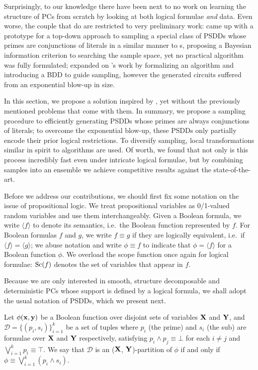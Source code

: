 Surprisingly, to our knowledge there have been next to no work on learning the structure of PCs
from scratch by looking at both logical formulae \emph{and} data. Even worse, the couple that do
are restricted to very preliminary work: \citet{mattei19} came up with a \divclass{} prototype for
a top-down approach to sampling a special class of PSDDs whose primes are conjunctions of literals
in a similar manner to s, proposing a Bayesian information criterion to searching the
sample space, yet no practical algorithm was fully formulated; \citet{geh20} expanded on
\citeauthor{mattei19}'s work by formalizing an algorithm and introducing a BDD to guide sampling,
however the generated circuits suffered from an exponential blow-up in size.

In this section, we propose a solution inspired by \citet{geh20,mattei19}, yet without the
previously mentioned problems that come with them. In summary, we propose a sampling procedure to
efficiently generating PSDDs whose primes are always conjunctions of literals; to overcome the
exponential blow-up, these PSDDs only partially encode their prior logical restrictions. To
diversify sampling, local transformations similar in spirit to \incrclass{} algorithms are used.
Of worth, we found that not only is this process incredibly fast even under intricate logical
formulae, but by combining samples into an ensemble we achieve competitive results against the
state-of-the-art.

Before we address our contributions, we should first fix some notation on the issue of
propositional logic. We treat propositional variables as 0/1-valued random variables and use them
interchangeably. Given a Boolean formula, we write $\langle f\rangle$ to denote its semantics,
i.e.\ the Boolean function represented by $f$. For Boolean formulas $f$ and $g$, we write $f\equiv
g$ if they are logically equivalent, i.e.\ if $\langle f\rangle=\langle g\rangle$; we abuse
notation and write $\phi\equiv f$ to indicate that $\phi=\langle f\rangle$ for a Boolean function
$\phi$. We overload the scope function once again for logical formulae: $\operatorname*{\normalfont{Sc}}(f)$ denotes the set of
variables that appear in $f$.

Because we are only interested in smooth, structure decomposable and deterministic PCs whose
support is defined by a logical formula, we shall adopt the usual notation of PSDDs, which we
present next.

\begin{definition}[Partition]\label{def:partition}
  Let $\phi(\mathbf{x},\mathbf{y})$ be a Boolean function over disjoint sets of variables $\mathbf{X}$ and
  $\mathbf{Y}$, and $\mathcal{D}=\{(p_i,s_i)\}_{i=1}^k$ be a set of tuples where $p_i$ (the prime) and
  $s_i$ (the sub) are formulae over $\mathbf{X}$ and $\mathbf{Y}$ respectively, satisfying $p_i\wedge
  p_j\equiv\bot$ for each $i\neq j$ and $\bigvee_{i=1}^k p_i\equiv\top$. We say that $\mathcal{D}$
  is an ($\mathbf{X}$, $\mathbf{Y}$)-partition of $\phi$ if and only if
  $\phi\equiv\bigvee_{i=1}^k(p_i\wedge s_i)$.
\end{definition}

